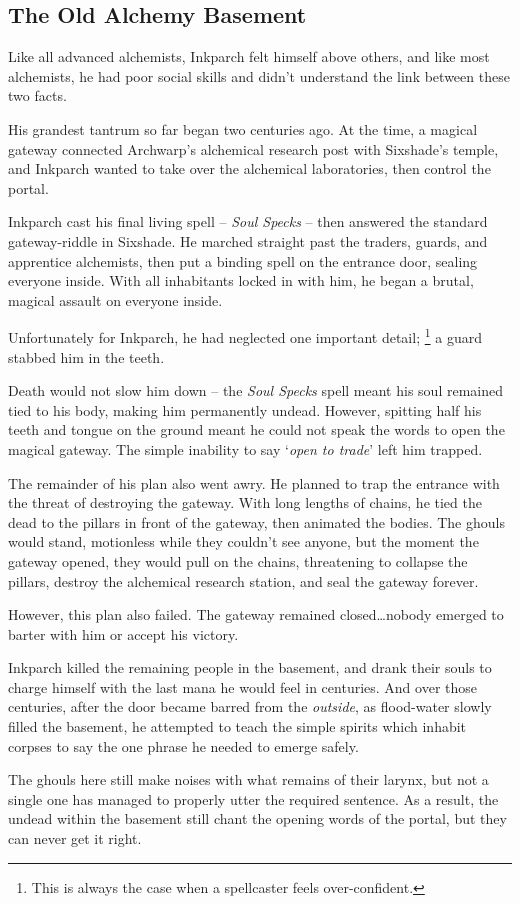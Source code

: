 \subsection{The Old Alchemy Basement}
\label{old_alchemy_basement}

\begin{exampletext}
  Like all advanced alchemists, Inkparch felt himself above others, and like most alchemists, he had poor social skills and didn't understand the link between these two facts.

  His grandest tantrum so far began two centuries ago.
  At the time, a magical gateway connected Archwarp's alchemical research post with Sixshade's temple, and Inkparch wanted to take over the alchemical laboratories, then control the portal.

  Inkparch cast his final living spell -- \textit{Soul Specks} -- then answered the standard gateway-riddle in Sixshade.
  He marched straight past the traders, guards, and apprentice alchemists, then put a binding spell on the entrance door, sealing everyone inside.
  With all inhabitants locked in with him, he began a brutal, magical assault on everyone inside.

  Unfortunately for Inkparch, he had neglected one important detail;%
  \footnote{This is always the case when a spellcaster feels over-confident.}
  a guard stabbed him in the teeth.

  Death would not slow him down -- the \textit{Soul Specks} spell meant his soul remained tied to his body, making him permanently undead.
  However, spitting half his teeth and tongue on the ground meant he could not speak the words to open the magical gateway.
  The simple inability to say `\textit{open to trade}' left him trapped.

  The remainder of his plan also went awry.
  He planned to trap the entrance with the threat of destroying the gateway.
  With long lengths of chains, he tied the dead to the pillars in front of the gateway, then animated the bodies.
  The ghouls would stand, motionless while they couldn't see anyone, but the moment the gateway opened, they would pull on the chains, threatening to collapse the pillars, destroy the alchemical research station, and seal the gateway forever.

  However, this plan also failed.
  The gateway remained closed\ldots nobody emerged to barter with him or accept his victory.

  Inkparch killed the remaining people in the basement, and drank their souls to charge himself with the last mana he would feel in centuries.
  And over those centuries, after the door became barred from the \emph{outside}, as flood-water slowly filled the basement, he attempted to teach the simple spirits which inhabit corpses to say the one phrase he needed to emerge safely.

  The ghouls here still make noises with what remains of their larynx, but not a single one has managed to properly utter the required sentence.
  As a result, the undead within the basement still chant the opening words of the portal, but they can never get it right.
\end{exampletext}


